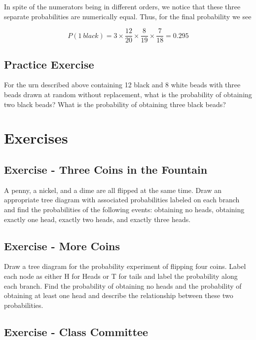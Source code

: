 \documentclass[]{book}
\theoremstyle{definition}
\theoremstyle{definition}
\theoremstyle{definition}
\theoremstyle{remark}
\begin{document}
In spite of the numerators being in different orders, we notice that
these three separate probabilities are numerically equal. Thus, for the
final probability we see

\[P(1\ black) = 3 \times \frac{12}{20} \times \frac{8}{19} \times \frac{7}{18} = 0.295\]

\subsection{Practice Exercise}\label{practice-exercise-6}

For the urn described above containing 12 black and 8 white beads with
three beads drawn at random without replacement, what is the probability
of obtaining two black beads? What is the probability of obtaining three
black beads?

\section{Exercises}\label{exercises}

\subsection{Exercise - Three Coins in the
Fountain}\label{exercise---three-coins-in-the-fountain}

A penny, a nickel, and a dime are all flipped at the same time. Draw an
appropriate tree diagram with associated probabilities labeled on each
branch and find the probabilities of the following events: obtaining no
heads, obtaining exactly one head, exactly two heads, and exactly three
heads.

\subsection{Exercise - More Coins}\label{exercise---more-coins}

Draw a tree diagram for the probability experiment of flipping four
coins. Label each node as either H for Heads or T for tails and label
the probability along each branch. Find the probability of obtaining no
heads and the probability of obtaining at least one head and describe
the relationship between these two probabilities.

\subsection{Exercise - Class
Committee}\label{exercise---class-committee}
\end{document}
